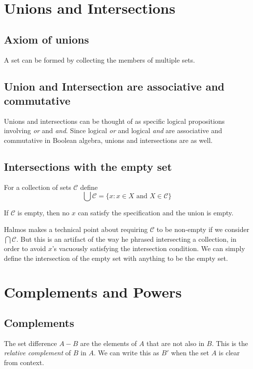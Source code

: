 \documentclass{article}
\begin{document}
\section{Unions and Intersections}

\subsection{Axiom of unions} A set can be formed by collecting the members of multiple sets. 

\subsection{Union and Intersection are associative and commutative} Unions and intersections can be thought of as specific logical propositions involving \textit{or} and \textit{and}. Since logical \textit{or} and logical \textit{and} are associative and commutative in Boolean algebra, unions and intersections are as well.

\subsection{Intersections with the empty set} For a collection of sets $\mathcal{C}$ define 
$$\bigcup \mathcal{C} = \{x: x \in X \text{ and } X \in \mathcal{C}\}$$

If $\mathcal{C}$ is empty, then no $x$ can satisfy the specification and the union is empty. 

Halmos makes a technical point about requiring $\mathcal{C}$ to be non-empty if we consider $\bigcap \mathcal{C}$. But this is an artifact of the way he phrased intersecting a collection, in order to avoid $x$'s vacuously satisfying the intersection condition. We can simply define the intersection of the empty set with anything to be the empty set.

\section{Complements and Powers}

\subsection{Complements} The set difference $A - B$ are the elements of $A$ that are not also in $B$. This is the \textit{relative complement} of $B$ in $A$. We can write this as $B'$ when the set $A$ is clear from context.
\end{document}
